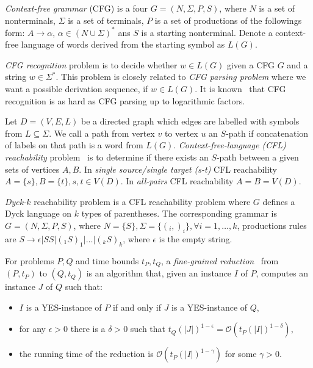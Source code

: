 \documentclass[acmsmall,nonacm]{acmart}
\begin{document}
	\emph{Context-free grammar} (CFG) is a four $G=(N, \Sigma, P, S)$, where $N$ is a set of nonterminals, $\Sigma$ is a set of terminals, $P$ is a set of productions of the followings form: $A \to \alpha$, $\alpha \in (N \cup \Sigma)^*$ ans $S$ is a starting nonterminal. Denote a context-free language of words derived from the starting symbol as $L(G)$.

	\emph{CFG recognition} problem is to decide whether $w \in L(G)$ given a CFG $G$ and a string $w \in \Sigma^*$. This problem is closely related to \emph{CFG parsing problem} where we want a possible derivation sequence, if $w \in L(G)$. It is known~\cite{10.5555/646233.682379} that CFG recognition is as hard as CFG parsing up to logarithmic factors.

	Let $D = (V, E, L)$ be a directed graph which edges are labelled with symbols from $L \subseteq \Sigma$. We call a path from vertex $v$ to vertex $u$ an $S$-path if concatenation of labels on that path is a word from $L(G)$.  \emph{Context-free-language (CFL) reachability} problem~\cite{REPS1998701} is to determine if there exists an $S$-path between a given sets of vertices $A, B$. In \emph{single source/single target (s-t)} CFL reachability $A = \{s\}, B = \{t\}, s, t \in V(D)$. In \emph{all-pairs} CFL reachability $A = B = V(D)$.

	\emph{Dyck-$k$} reachability problem is a CFL reachability problem where $G$ defines a Dyck language on $k$ types of parentheses. The corresponding grammar is $G=(N, \Sigma, P, S)$, where $N = \{S\}, \Sigma = \{(_i, )_i\}, \forall i = 1, \ldots, k$, productions rules are $S \rightarrow \epsilon | SS | (_1 S )_1 | \ldots | (_k S )_k$, where $\epsilon$ is the empty string. 

	For problems $P, Q$ and time bounds $t_P, t_Q$, a \emph{fine-grained reduction}~\cite{bringmann2019fine} from $(P, t_P)$ to $(Q, t_Q)$ is an algorithm that, given an instance $I$ of $P$, computes an instance $J$ of $Q$ such that: 
	
	\begin{itemize}
		\item $I$ is a YES-instance of $P$ if and only if $J$ is a YES-instance of $Q$,
		\item for any $\epsilon > 0$ there is a $\delta > 0$ such that $t_Q(|J|)^{1 - \epsilon} = \mathcal{O}(t_P (|I|)^{1 - \delta})$, 
		\item the running time of the reduction is $\mathcal{O}(t_P (|I|)^{1 - \gamma})$ for some $\gamma > 0$.
	\end{itemize}
\end{document}

